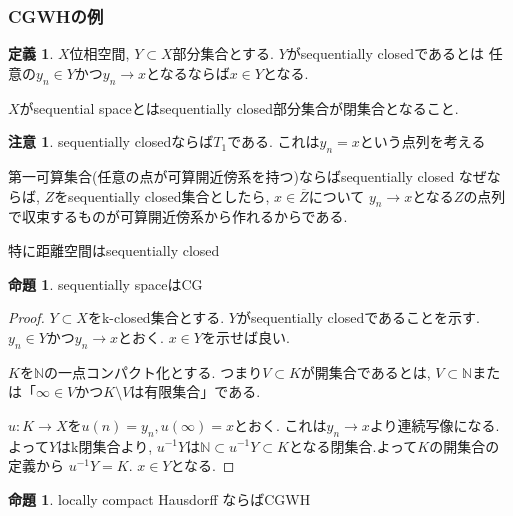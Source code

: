 \documentclass[dvipdfmx,a4paper,11pt]{report}
\newcommand{\N}{\mathbb{N}}
\theoremstyle{definition}
\newtheorem{prop}[thm]{命題}
\newtheorem{dfn}[thm]{定義}
\newtheorem{rem}[thm]{注意}
\begin{document}
\subsubsection{CGWHの例}

 \begin{tcolorbox}
 [colback = white, colframe = green!35!black, fonttitle = \bfseries,breakable = true]
\begin{dfn}\cite{Str}
$X$位相空間, $Y \subset X$部分集合とする.
$Y$がsequentially closedであるとは
任意の$y_n \in Y$かつ$y_n \to x$となるならば$x \in Y$となる.

$X$がsequential spaceとはsequentially closed部分集合が閉集合となること. 
\end{dfn}
\end{tcolorbox}
\begin{rem}
sequentially closedならば$T_1$である. これは$y_n =x$という点列を考える

第一可算集合(任意の点が可算開近傍系を持つ)ならばsequentially closed
なぜならば, $Z$をsequentially closed集合としたら, $x \in \overline{Z}$について
$y_n \to x$となる$Z$の点列で収束するものが可算開近傍系から作れるからである.

特に距離空間はsequentially closed
\end{rem}

 \begin{tcolorbox}
 [colback = white, colframe = green!35!black, fonttitle = \bfseries,breakable = true]
\begin{prop}\cite[Prop 1.6]{Str}
sequentially spaceはCG
\end{prop}
\end{tcolorbox}
\begin{proof}
$Y \subset X$をk-closed集合とする.
$Y$がsequentially closedであることを示す.
$y_n \in Y$かつ$y_n \to x$とおく. $x \in Y$を示せば良い.

$K$を$\N$の一点コンパクト化とする.
つまり$V \subset K$が開集合であるとは, $V \subset \N$または「$\infty \in V$かつ$K \setminus V$は有限集合」である. 

$u : K \to X$を$u(n)=y_n, u(\infty)=x$とおく. 
これは$y_n \to x$より連続写像になる. 
よって$Y$はk閉集合より, $u^{-1}Y$は$\N \subset u^{-1}Y\subset K$となる閉集合.よって$K$の開集合の定義から $u^{-1}Y = K$. $x \in Y$となる. 
\end{proof}

 \begin{tcolorbox}
 [colback = white, colframe = green!35!black, fonttitle = \bfseries,breakable = true]
\begin{prop}\cite[Prop 1.7]{Str}
locally compact Hausdorff ならばCGWH
\end{prop}
\end{tcolorbox}
\end{document}
